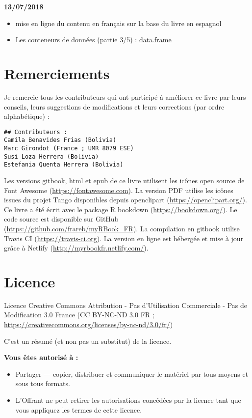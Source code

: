 \documentclass[]{book}
\providecommand{\tightlist}{%
  \setlength{\itemsep}{0pt}\setlength{\parskip}{0pt}}
\theoremstyle{definition}
\theoremstyle{definition}
\theoremstyle{definition}
\theoremstyle{remark}
\begin{document}
\textbf{13/07/2018}

\begin{itemize}
\tightlist
\item
  mise en ligne du contenu en français sur la base du livre en espagnol
\item
  Les conteneurs de données (partie 3/5) :
  \protect\hyperlink{l014dataframe}{data.frame}
\end{itemize}

\chapter{Remerciements}\label{remerciements}

Je remercie tous les contributeurs qui ont participé à améliorer ce
livre par leurs conseils, leurs suggestions de modifications et leurs
corrections (par ordre alphabétique) :

\begin{verbatim}
## Contributeurs :
Camila Benavides Frias (Bolivia)
Marc Girondot (France ; UMR 8079 ESE)
Susi Loza Herrera (Bolivia)
Estefania Quenta Herrera (Bolivia)
\end{verbatim}

Les versions gitbook, html et epub de ce livre utilisent les icônes open
source de Font Awesome (\url{https://fontawesome.com}). La version PDF
utilise les icônes issues du projet Tango disponibles depuis openclipart
(\url{https://openclipart.org/}). Ce livre a été écrit avec le package R
bookdown (\url{https://bookdown.org/}). Le code source est disponible
sur GitHub (\url{https://github.com/frareb/myRBook_FR}). La compilation
en gitbook utilise Travis CI (\url{https://travis-ci.org}). La version
en ligne est hébergée et mise à jour grâce à Netlify
(\url{http://myrbookfr.netlify.com/}).

\chapter{Licence}\label{licence}

Licence Creative Commons Attribution - Pas d'Utilisation Commerciale -
Pas de Modification 3.0 France (CC BY-NC-ND 3.0 FR ;
\url{https://creativecommons.org/licenses/by-nc-nd/3.0/fr/})

C'est un résumé (et non pas un substitut) de la licence.

\textbf{Vous êtes autorisé à :}

\begin{itemize}
\tightlist
\item
  Partager --- copier, distribuer et communiquer le matériel par tous
  moyens et sous tous formats.
\item
  L'Offrant ne peut retirer les autorisations concédées par la licence
  tant que vous appliquez les termes de cette licence.
\end{itemize}
\end{document}
